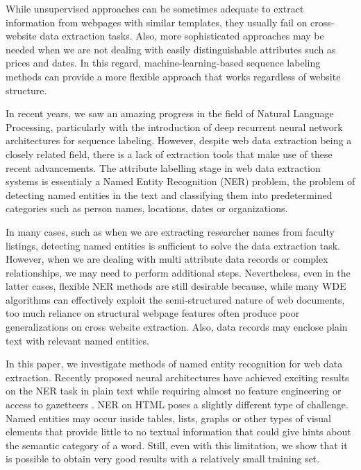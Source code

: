 \documentclass{nle}
\begin{document}
While unsupervised approaches can be sometimes adequate to extract information from 
webpages with similar templates, they usually fail on cross-website data extraction 
tasks. Also, more sophisticated approaches may be needed when we are not dealing
with easily distinguishable attributes such as prices and dates. In this regard, 
machine-learning-based sequence labeling methods can provide a more flexible 
approach that works regardless of website structure.

In recent years, we saw an amazing progress in the field of Natural Language Processing, 
particularly with the introduction of deep recurrent neural network architectures
for sequence labeling. However, despite web data extraction being a closely 
related field, there is a lack of extraction tools that make use of these recent 
advancements. The attribute labelling stage in web data extraction systems
is essentialy a Named Entity Recognition (NER) problem, the problem of 
detecting named entities in the text and classifying them into predetermined 
categories such as person names, locations, dates or organizations. 

In many cases, such as when we are extracting researcher names from faculty listings,
detecting named entities is sufficient to solve the data extraction task. However, when we are
dealing with multi attribute data records or complex relationships, we may need to 
perform additional steps. Nevertheless, even in the latter cases, flexible NER methods 
are still desirable because, while many WDE algorithms can effectively exploit the 
semi-structured nature of web documents, too much reliance on structural webpage 
features often produce poor generalizations on cross website extraction. Also, 
data records may enclose plain text with relevant named entities. 

In this paper, we investigate methods of named entity recognition for web data extraction.
Recently proposed neural architectures have achieved exciting results 
on the NER task in plain text while requiring almost 
no feature engineering or access to gazetteers \cite{Huang2015,Lample2016,Ma2016}. 
NER on HTML poses a slightly different type of challenge. Named entities may occur inside 
tables, lists, graphs or other types of visual elements that provide little to no textual 
information that could give hints about the semantic category of a word. Still, even 
with this limitation, we show that it is possible to obtain very good results with a 
relatively small training set.
\end{document}
